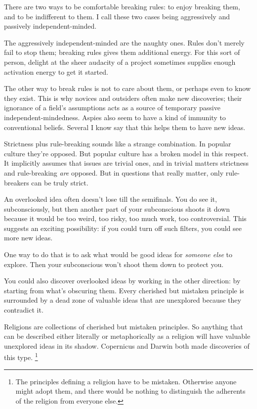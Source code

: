There are two ways to be comfortable breaking rules: to enjoy breaking
them, and to be indifferent to them. I call these two cases being
aggressively and passively independent-minded.

The aggressively independent-minded are the naughty ones. Rules don't
merely fail to stop them; breaking rules gives them additional energy.
For this sort of person, delight at the sheer audacity of a project
sometimes supplies enough activation energy to get it started.

The other way to break rules is not to care about them, or perhaps even
to know they exist. This is why novices and outsiders often make new
discoveries; their ignorance of a field's assumptions acts as a source
of temporary passive independent-mindedness. Aspies also seem to have a
kind of immunity to conventional beliefs. Several I know say that this
helps them to have new ideas.

Strictness plus rule-breaking sounds like a strange combination. In
popular culture they're opposed. But popular culture has a broken model
in this respect. It implicitly assumes that issues are trivial ones, and
in trivial matters strictness and rule-breaking \emph{are} opposed. But
in questions that really matter, only rule-breakers can be truly strict.

An overlooked idea often doesn't lose till the semifinals. You do see
it, subconsciously, but then another part of your subconscious shoots it
down because it would be too weird, too risky, too much work, too
controversial. This suggests an exciting possibility: if you could turn
off such filters, you could see more new ideas.

One way to do that is to ask what would be good ideas for \emph{someone
else} to explore. Then your subconscious won't shoot them down to
protect you.

You could also discover overlooked ideas by working in the other
direction: by starting from what's obscuring them. Every cherished but
mistaken principle is surrounded by a dead zone of valuable ideas that
are unexplored because they contradict it.

Religions are collections of cherished but mistaken principles. So
anything that can be described either literally or metaphorically as a
religion will have valuable unexplored ideas in its shadow. Copernicus
and Darwin both made discoveries of this type. \footnote{The principles defining a religion have to be mistaken.
Otherwise anyone might adopt them, and there would be nothing to
distinguish the adherents of the religion from everyone else.}

